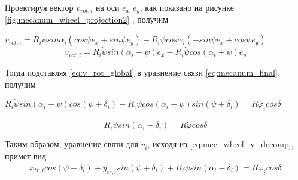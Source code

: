 \documentclass[oneside,final,14pt]{extreport}
\begin{document}
Проектируя вектор $v_{rot,i}$ на оси $e_{x}$ $e_{y}$, как показано на рисунке \ref{fig:mecanum_wheel_projection2} , получим

$
v_{rot,i}
=
R_{i}
\dot{\psi}
sin\alpha_{i}
(
cos\psi e_{x}
+
sin\psi e_{y}
)
-
R_{i}
\dot{\psi}
cos\alpha_{i}
(
-sin\psi e_{x}
+
cos\psi e_{y}
)
$
\begin{equation}
\label{eq:v_rot_global}
v_{rot,i}
=
R_{i}
\dot{\psi}
sin(\alpha_{i} + \psi)
e_{x}
-
R_{i}
\dot{\psi}
cos(\alpha_{i} + \psi)
e_{y}
\end{equation}

\begin{figure}[H]
\end{figure}

Тогда подставляя \ref{eq:v_rot_global} в уравнение связи \ref{eq:mecanum_final}, получим

$
R_{i}
\dot{\psi}
sin(\alpha_{i} + \psi)
cos(\psi + \delta_{i})
-
R_{i}
\dot{\psi}
cos(\alpha_{i} + \psi)
sin(\psi + \delta_{i})
=
R\dot{\varphi_{i}}
cos\delta
$

\begin{equation}
R_{i}
\dot{\psi}
sin(\alpha_{i} - \delta_{i})
=
R
\dot{\varphi}
cos\delta
\end{equation}

Таким образом, уравнение связи для $v_{i}$, исходя из \ref{eq:mec_wheel_v_decomp}, примет вид
\begin{equation}
\dot{x_{tr,i}}
cos(\psi+\delta_{i})
+
\dot{y_{tr,i}}
sin(\psi+\delta_{i})
+
R_{i}
\dot{\psi}
sin(\alpha_{i}-\delta_{i})
=
R\dot{\varphi_{i}}
cos\delta
\end{equation}
\end{document}
